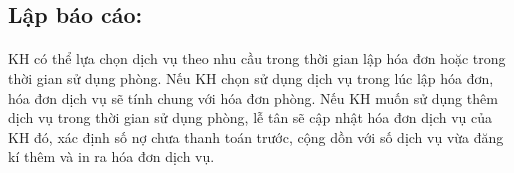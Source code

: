 \fontsize{14}{20}\selectfont
\subsection{Lập báo cáo:}
\fontsize{13}{20}\selectfont
\paragraph{}
KH có thể lựa chọn dịch vụ theo nhu cầu trong thời gian lập hóa đơn hoặc trong thời gian sử dụng phòng. Nếu KH chọn sử dụng dịch vụ trong lúc lập hóa đơn, hóa đơn dịch vụ sẽ tính chung với hóa đơn phòng. Nếu KH muốn sử dụng thêm dịch vụ trong thời gian sử dụng phòng, lễ tân sẽ cập nhật hóa đơn dịch vụ của KH đó, xác định số nợ chưa thanh toán trước, cộng dồn với số dịch vụ vừa đăng kí thêm và in ra hóa đơn dịch vụ.
